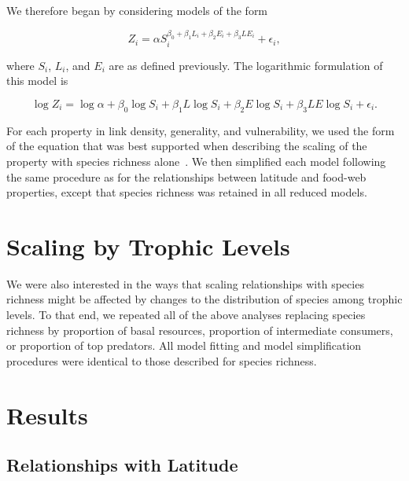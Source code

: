 \documentclass[12pt]{article}
\begin{document}
\begin{spacing}{1.0}
    We therefore began by considering models of the form

    \begin{equation}
    \label{PowerLat}
    Z_{i}=\alpha S_{i}^{\beta_{0}+\beta_{1}L_{i}+\beta_{2}E_{i}+\beta_{3}LE_{i}} + \epsilon_{i} ,
    \end{equation}

    \noindent where $S_{i}$, $L_{i}$, and $E_{i}$ are as defined previously. The logarithmic formulation of this model is

    \begin{equation}
    \label{LogLat}
    \log{Z_{i}} = \log{\alpha}+\beta_{0}\log{S_{i}} + \beta_{1}L\log{S_{i}} +\beta_{2}E\log{S_{i}} +\beta_{3}LE\log{S_{i}} +\epsilon_{i} .
    \end{equation}

    For each property in link density, generality, and vulnerability, we used the form of the equation that was best supported
    when describing the scaling of the property with species richness alone~\citep{Xiao2011}.
    We then simplified each model following the same procedure as for the relationships between
    latitude and food-web properties, except that species richness was retained in all reduced models. 


  \section*{Scaling by Trophic Levels}

    We were also interested in the ways that scaling relationships with species richness might
    be affected by changes to the distribution of species among trophic levels. To
    that end, we repeated all of the above analyses replacing species richness by
    proportion of basal resources, proportion of intermediate consumers,
    or proportion of top predators. All model fitting and model
    simplification procedures were identical to those described for species
    richness.


\section*{Results}

  \subsection*{Relationships with Latitude}


\end{spacing}
\end{document}
